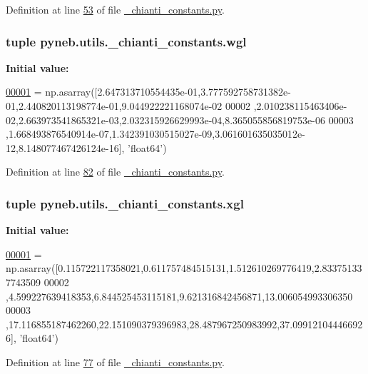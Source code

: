 Definition at line \hyperlink{__chianti__constants_8py_source_l00053}{53} of file \hyperlink{__chianti__constants_8py_source}{\+\_\+chianti\+\_\+constants.\+py}.

\hypertarget{namespacepyneb_1_1utils_1_1__chianti__constants_a46ae7f1b894a2436d928f1280232b724}{}
\subsubsection[{wgl}]{\setlength{\rightskip}{0pt plus 5cm}tuple pyneb.\+utils.\+\_\+chianti\+\_\+constants.\+wgl}\label{namespacepyneb_1_1utils_1_1__chianti__constants_a46ae7f1b894a2436d928f1280232b724}
{\bfseries Initial value\+:}
\begin{DoxyCode}
\hypertarget{namespacepyneb_1_1utils_1_1__chianti__constants_l00001}{}\hyperlink{namespacepyneb_1_1utils_1_1__chianti__constants}{00001} = np.asarray([2.647313710554435e-01,3.777592758731382e-01,2.440820113198774e-01,9.044922221168074e-02
00002     ,2.010238115463406e-02,2.663973541865321e-03,2.032315926629993e-04,8.365055856819753e-06
00003     ,1.668493876540914e-07,1.342391030515027e-09,3.061601635035012e-12,8.148077467426124e-16], \textcolor{stringliteral}{'float64'})
\end{DoxyCode}


Definition at line \hyperlink{__chianti__constants_8py_source_l00082}{82} of file \hyperlink{__chianti__constants_8py_source}{\+\_\+chianti\+\_\+constants.\+py}.

\hypertarget{namespacepyneb_1_1utils_1_1__chianti__constants_af1590059269ec4a1186c9746d22d1201}{}
\subsubsection[{xgl}]{\setlength{\rightskip}{0pt plus 5cm}tuple pyneb.\+utils.\+\_\+chianti\+\_\+constants.\+xgl}\label{namespacepyneb_1_1utils_1_1__chianti__constants_af1590059269ec4a1186c9746d22d1201}
{\bfseries Initial value\+:}
\begin{DoxyCode}
\hypertarget{namespacepyneb_1_1utils_1_1__chianti__constants_l00001}{}\hyperlink{namespacepyneb_1_1utils_1_1__chianti__constants}{00001} = np.asarray([0.115722117358021,0.611757484515131,1.512610269776419,2.833751337743509
00002     ,4.599227639418353,6.844525453115181,9.621316842456871,13.006054993306350
00003     ,17.116855187462260,22.151090379396983,28.487967250983992,37.099121044466926], \textcolor{stringliteral}{'float64'})
\end{DoxyCode}


Definition at line \hyperlink{__chianti__constants_8py_source_l00077}{77} of file \hyperlink{__chianti__constants_8py_source}{\+\_\+chianti\+\_\+constants.\+py}.

